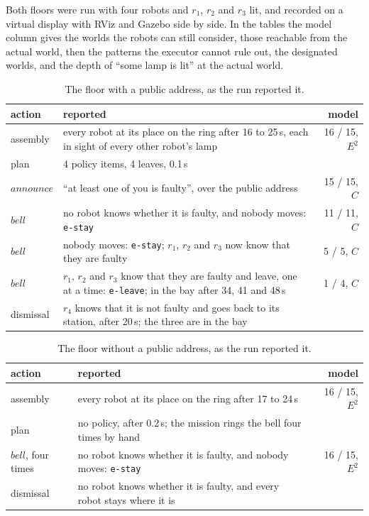 \documentclass[11pt,a4paper]{article}
\theoremstyle{definition}
\newcommand{\code}[1]{\texttt{\small #1}}
\begin{document}
Both floors were run with four robots and $r_1$, $r_2$ and $r_3$ lit, and
recorded on a virtual display with RViz and Gazebo side by side. In the tables
the model column gives the worlds the robots can still consider, those
reachable from the actual world, then the patterns the executor cannot rule
out, the designated worlds, and the depth of ``some lamp is lit'' at the actual
world.

\begin{table}[H]
\centering\small
\caption{The floor with a public address, as the run reported it.}
\label{tab:pa-run}
\begin{tabularx}{\textwidth}{@{}l X r@{}}
\toprule
action & reported & model \\
\midrule
assembly & every robot at its place on the ring after 16 to 25\,s, each in sight of every other robot's lamp & 16 / 15, $E^2$ \\
plan & 4 policy items, 4 leaves, 0.1\,s & \\
$\mathit{announce}$ & ``at least one of you is faulty'', over the public address & 15 / 15, $C$ \\
$\mathit{bell}$ & no robot knows whether it is faulty, and nobody moves: \code{e-stay} & 11 / 11, $C$ \\
$\mathit{bell}$ & nobody moves: \code{e-stay}; $r_1$, $r_2$ and $r_3$ now know that they are faulty & 5 / 5, $C$ \\
$\mathit{bell}$ & $r_1$, $r_2$ and $r_3$ know that they are faulty and leave, one at a time: \code{e-leave}; in the bay after 34, 41 and 48\,s & 1 / 4, $C$ \\
dismissal & $r_4$ knows that it is not faulty and goes back to its station, after 20\,s; the three are in the bay & \\
\bottomrule
\end{tabularx}
\end{table}

\begin{table}[H]
\centering\small
\caption{The floor without a public address, as the run reported it.}
\label{tab:silent-run}
\begin{tabularx}{\textwidth}{@{}l X r@{}}
\toprule
action & reported & model \\
\midrule
assembly & every robot at its place on the ring after 17 to 24\,s & 16 / 15, $E^2$ \\
plan & no policy, after 0.2\,s; the mission rings the bell four times by hand & \\
$\mathit{bell}$, four times & no robot knows whether it is faulty, and nobody moves: \code{e-stay} & 16 / 15, $E^2$ \\
dismissal & no robot knows whether it is faulty, and every robot stays where it is & \\
\bottomrule
\end{tabularx}
\end{table}
\end{document}
